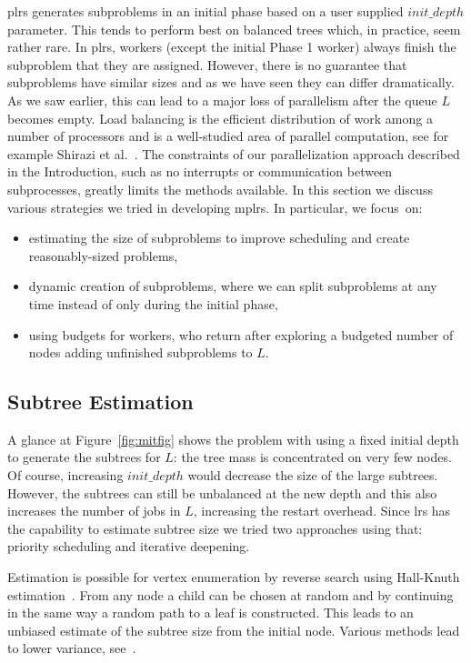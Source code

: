 \documentclass[a4paper,11pt]{article}   \usepackage{authblk} \usepackage[top=1.9cm,bottom=1.9cm,left=1.9cm,right=1.9cm]{geometry}
\newcommand{\progname}{\textsf}
\newcommand{\lrs}{\progname{lrs}\xspace}
\newcommand{\plrs}{\progname{plrs}\xspace}
\newcommand{\mplrs}{\progname{mplrs}\xspace}
\newcommand{\initdepth}{\ensuremath{\mathit{init\_depth}}\xspace}
\begin{document}
\label{sec:par}
\plrs generates subproblems
in an initial phase 
based on a user supplied \initdepth parameter.  This tends to perform best
on balanced trees which, in practice, seem rather rare.
In \plrs, workers (except the initial Phase 1 worker) always
finish the subproblem that they are assigned.  However, there is
no guarantee that subproblems have similar sizes and as we have seen 
they can differ dramatically.  As we saw earlier, this can lead to a major loss of parallelism
after the queue $L$ becomes empty. 
Load balancing is the efficient distribution of work among a number of processors and is 
a well-studied area of parallel computation, see for example Shirazi et al.~\cite{SLB}.
The constraints of our parallelization approach described in the Introduction, such as no
interrupts or communication between subprocesses, greatly limits the methods available.
In this section we discuss various strategies we tried in developing \mplrs.
In particular, we focus~on:
\begin{itemize}
 \item estimating the size of subproblems to 
improve scheduling and create reasonably-sized problems,
 \item dynamic creation of subproblems, where we
can split subproblems at any time instead of only during the initial phase,
 \item using budgets for workers, who return after exploring
a budgeted number of nodes adding unfinished subproblems to $L$.
\end{itemize}

\subsection{Subtree Estimation}
\label{subsec:subtree}
A glance at Figure~\ref{fig:mitfig} shows the problem with
using a fixed initial depth to generate the subtrees for $L$:
the tree mass is concentrated on very few nodes. Of course,
increasing \initdepth would decrease the size of the large subtrees.
However, the subtrees can still be unbalanced at the new depth and
this also increases the number of jobs in 
$L$, increasing the restart overhead. Since \lrs has
the capability to estimate subtree size we tried two approaches using that: 
priority scheduling and iterative deepening.

Estimation is possible for
vertex enumeration by reverse
search using Hall-Knuth estimation~\cite{HK}.
From any node a child can be chosen at random and by continuing
in the same way a random path to a leaf is constructed. This leads
to an unbiased estimate of the subtree size from the initial node.
Various methods lead to lower variance, see~\cite{AD00}. 
\end{document}
